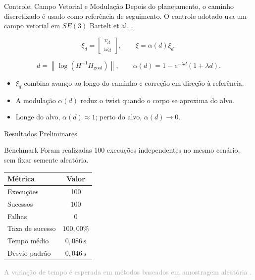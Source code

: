\documentclass[aspectratio=169]{beamer}
\newcommand{\smalltag}[1]{\textcolor{darkgray}{\scriptsize #1}}
\begin{document}
\begin{frame}{Controle: Campo Vetorial e Modulação}
    \footnotesize
    Depois do planejamento, o caminho discretizado é usado como referência de
    seguimento. O controle adotado usa um campo vetorial em \(SE(3)\) Bartelt et al. \cite{Bartelt2026}.

    \[
    \xi_d =
    \begin{bmatrix}
    v_d \\
    \omega_d
    \end{bmatrix},
    \qquad
    \xi = \alpha(d)\xi_d.
    \]

    \[
    d =
    \left\|
    \log\left(
    H^{-1}H_{\mathrm{goal}}
    \right)
    \right\|,
    \qquad
    \alpha(d)
    =
    1
    -
    e^{-\lambda d}
    \left(
    1+\lambda d
    \right).
    \]

    \begin{itemize}
        \item \(\xi_d\) combina avanço ao longo do caminho e correção em direção à referência.
        \item A modulação \(\alpha(d)\) reduz o twist quando o corpo se aproxima do alvo.
        \item Longe do alvo, \(\alpha(d)\approx 1\); perto do alvo, \(\alpha(d)\to 0\).
    \end{itemize}
\end{frame}

\begin{frame}{Resultados Preliminares}
    \begin{block}{Benchmark}
        Foram realizadas 100 execuções independentes no mesmo cenário, sem fixar
        semente aleatória.
    \end{block}

    \vspace{0.1cm}
    \begin{center}
        \begin{tabular}{lc}
            \toprule
            Métrica & Valor \\
            \midrule
            Execuções & 100 \\
            Sucessos & 100 \\
            Falhas & 0 \\
            Taxa de sucesso & \(100{,}00\%\) \\
            Tempo médio & \(0{,}086\,\mathrm{s}\) \\
            Desvio padrão & \(0{,}046\,\mathrm{s}\) \\
            \bottomrule
        \end{tabular}
    \end{center}

    \vspace{0.15cm}
    \smalltag{A variação de tempo é esperada em métodos baseados em amostragem aleatória \cite{LaValle2006}.}
\end{frame}
\end{document}
